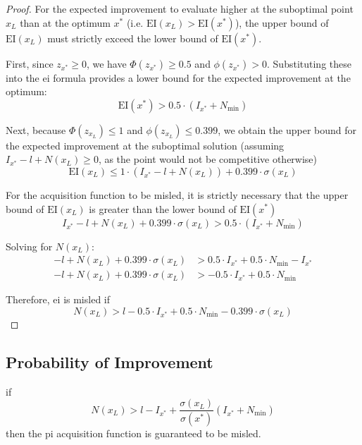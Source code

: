 \begin{proof}
For the expected improvement to evaluate higher at the suboptimal point $x_L$ than at the optimum $x^*$ (i.e. $\mathrm{EI}(x_L) > \mathrm{EI}(x^*)$), the upper bound of $\mathrm{EI}(x_L)$ must strictly exceed the lower bound of $\mathrm{EI}(x^*)$.

First, since $z_{x^*} \ge 0$, we have $\Phi(z_{x^*}) \ge 0.5$ and $\phi(z_{x^*}) > 0$. Substituting these into the \gls{ei} formula provides a lower bound for the expected improvement at the optimum:
\begin{equation*}
    \mathrm{EI}(x^*) > 0.5 \cdot (I_{x^*} + N_{\min})
\end{equation*}

Next, because $\Phi(z_{x_L}) \le 1$ and $\phi(z_{x_L}) \le 0.399$, we obtain the upper bound for the expected improvement at the suboptimal solution (assuming $I_{x^*} - l + N(x_L) \ge 0$, as the point would not be competitive otherwise)
\begin{equation*}
    \mathrm{EI}(x_L) \le 1 \cdot (I_{x^*} - l + N(x_L)) + 0.399 \cdot \sigma(x_L)
\end{equation*}

For the acquisition function to be misled, it is strictly necessary that the upper bound of $\mathrm{EI}(x_L)$ is greater than the lower bound of $\mathrm{EI}(x^*)$
\begin{equation*}
    I_{x^*} - l + N(x_L) + 0.399 \cdot \sigma(x_L) > 0.5 \cdot (I_{x^*} + N_{\min})
\end{equation*}

Solving for $N(x_L)$:
\begin{align*}
    -l + N(x_L) + 0.399 \cdot \sigma(x_L) &> 0.5 \cdot I_{x^*} + 0.5 \cdot N_{\min} - I_{x^*} \\
    -l + N(x_L) + 0.399 \cdot \sigma(x_L) &> -0.5 \cdot I_{x^*} + 0.5 \cdot N_{\min}
\end{align*}

Therefore, \gls{ei} is misled if
\begin{equation*}
    N(x_L) > l - 0.5 \cdot I_{x^*} + 0.5 \cdot N_{\min} - 0.399 \cdot \sigma(x_L)
\end{equation*}
\end{proof}

\subsection{Probability of Improvement}
\begin{theorem}
if
\begin{equation*}
    N(x_L) > l - I_{x^*} + \frac{\sigma(x_L)}{\sigma(x^*)} (I_{x^*} + N_{\min})
\end{equation*}
then the \gls{pi} acquisition function is guaranteed to be misled.
\end{theorem}

